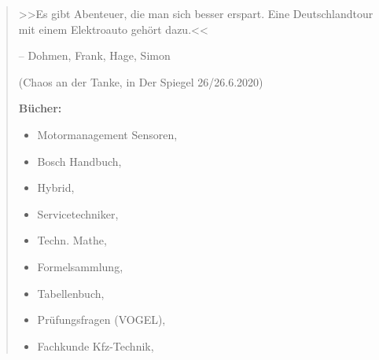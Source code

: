 \null\vfil
\begin{otherlanguage}{ngerman}
\begin{center}\textsf{\textbf{\abstractname}}\end{center}


    \begin{quote}
        \textcolor{rot5}{>>Es gibt Abenteuer, die man sich besser erspart. Eine Deutschlandtour mit einem Elektroauto gehört dazu.<<}\\ 
        \raggedleft \small{-- Dohmen, Frank, Hage, Simon
        
        (Chaos an der Tanke, in Der Spiegel 26/26.6.2020)}%
        
        \raggedright

        \textbf{Bücher:}

        \begin{itemize}         
            \item Motormanagement Sensoren, \textcite{schneehage:2021:motormanagement}
            \item Bosch Handbuch, \textcite{reif:2022:boschkraftfahrtechnisches}
            \item Hybrid, \textcite{schmidt:2021:hybrid}
            \item Servicetechniker, \textcite{respondeck:2019:servicetechniker}
            \item Techn. Mathe, \textcite{elbl:2016:technMa}       
            \item Formelsammlung, \textcite{bell:2020:formelsammlung}
            \item Tabellenbuch, \textcite{bell:2021:tabellenbuchKfz}
            \item Prüfungsfragen (VOGEL), \textcite{schluter:2021:prufungsfragenKfz}
            \item Fachkunde Kfz-Technik, \textcite{brand:2020:fachkundeKfz}
        \end{itemize}


    \end{quote}

\end{otherlanguage}
\vfil\null



